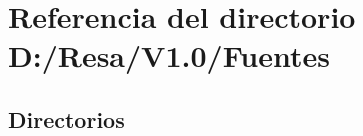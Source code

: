 \section{Referencia del directorio D\+:/\+Resa/\+V1.0/\+Fuentes}
\label{dir_7686cbd243aff24c4e561acfc8f0c236}
\subsection*{Directorios}
\begin{DoxyCompactItemize}
\end{DoxyCompactItemize}

